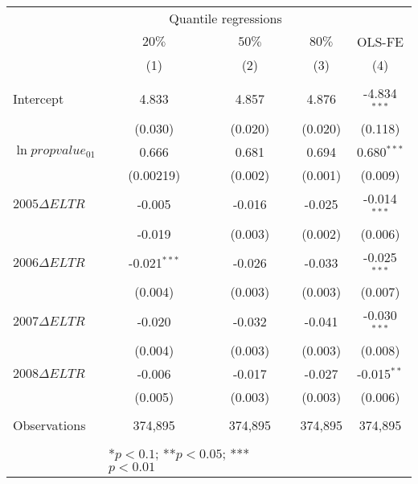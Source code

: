 \begin{table}[H]
  \centering
  \begin{tabular}{@{}lcccc@{}}
  \toprule
                         & \multicolumn{3}{c}{Quantile regressions} &           \\ \cmidrule(lr){2-4}
                         & $20\%$       & $50\%$      & $80\%$      & OLS-FE    \\
                         & (1)          & (2)         & (3)         & (4)       \\ \midrule
  \multicolumn{5}{l}{}                                                          \\
  Intercept             &  4.833\sym{***}   &  4.857\sym{***}   & 4.876\sym{***}  & -4.834$^{***}$ \\
                        & (0.030)           & (0.020)           & (0.020)         & (0.118) \\
  $\ln{propvalue_{01}}$ & 0.666\sym{***}    &  0.681\sym{***}   & 0.694\sym{***}   & 0.680$^{***}$ \\
                        & (0.00219)         & (0.002)           & (0.001)         & (0.009) \\
 $2005\Delta ELTR$      & -0.005            & -0.016\sym{***}   & -0.025\sym{***}  & -0.014$^{***}$ \\
                        & -0.019\sym{***}   & (0.003)           & (0.002)         & (0.006) \\
 $2006\Delta ELTR$      & -0.021$^{***}$    & -0.026\sym{***}    &  -0.033\sym{***} & -0.025$^{***}$ \\
                        & (0.004)           & (0.003)           & (0.003)         & (0.007) \\
 $2007\Delta ELTR$      & -0.020\sym{***}   & -0.032\sym{***}   & -0.041\sym{***}  & -0.030$^{***}$ \\
                        & (0.004)           & (0.003)          & (0.003)         & (0.008) \\
 $2008\Delta ELTR$      & -0.006            & -0.017\sym{***}   & -0.027\sym{***}  & -0.015$^{**}$ \\
                        & (0.005)           & (0.003)           & (0.003)         & (0.006) \\ \midrule
  \multicolumn{5}{l}{}                                                          \\
  Observations & 374,895 & 374,895 & 374,895 & 374,895 \\
  \multicolumn{5}{l}{}                                                          \\ \midrule
                & \multicolumn{2}{l}{*$p<0.1$; **$p<0.05$; ***$p<0.01$}
  \end{tabular}
  \end{table}